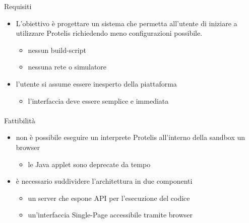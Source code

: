 \documentclass[
  usepdftitle=false,  %
  bigger,               %
  lualatex,           %
  italian             %
]{beamer}
\begin{document}
    \begin{frame}{\insertsectionhead}{\insertsubsectionhead}

      \begin{block}{Requisiti}
        \begin{itemize}
          \item
            L'obiettivo è progettare un sistema che permetta all'utente di iniziare a utilizzare Protelis richiedendo meno configurazioni possibile.
            \begin{itemize}
              \item nessun build-script
              \item nessuna rete o simulatore
            \end{itemize}
          \item
            l'utente si assume essere inesperto della piattaforma
            \begin{itemize}
              \item l'interfaccia deve essere semplice e immediata
            \end{itemize}
        \end{itemize}
      \end{block}

    \end{frame}

    \begin{frame}{\insertsectionhead}
      \framesubtitle{\insertsubsectionhead}

      \begin{block}{Fattibilità}
        \begin{itemize}
          \item
            non è possibile eseguire un interprete Protelis all'interno della sandbox un browser
            \begin{itemize}
              \item le Java applet sono deprecate da tempo
            \end{itemize}
          \item
            è necessario suddividere l'architettura in due componenti
            \begin{itemize}
              \item un server che espone API per l'esecuzione del codice
              \item un'interfaccia Single-Page accessibile tramite browser
            \end{itemize}
        \end{itemize}
      \end{block}

    \end{frame}
\end{document}
